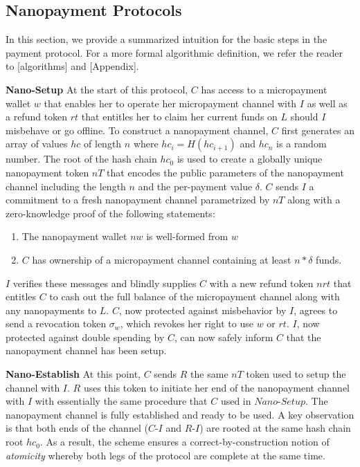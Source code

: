 \subsection{Nanopayment Protocols}

In this section, we provide a summarized intuition for the basic steps in the
payment protocol. For a more formal algorithmic definition, we refer the reader
to [algorithms] and [Appendix].

\textbf{Nano-Setup} At the start of this protocol, $C$ has access to a
micropayment wallet $w$ that enables her to operate her micropayment channel
with $I$ as well as a refund token $rt$ that entitles her to claim her current
funds on $L$ should $I$ misbehave or go offline. To construct a nanopayment
channel, $C$ first generates an array of values $hc$ of length $n$ where
$hc_i = H(hc_{i+1})$ and $hc_n$ is a random number. The root of the hash chain
$hc_0$ is used to create a globally unique nanopayment token $nT$ that encodes
the public parameters of the nanopayment channel including the length $n$ and
the per-payment value $\delta$. $C$ sends $I$ a commitment to a fresh
nanopayment channel parametrized by $nT$ along with a zero-knowledge proof of
the following statements:

\begin{enumerate}
\item The nanopayment wallet $nw$ is well-formed from $w$
\item $C$ has ownership of a micropayment channel containing at least $n *
  \delta$ funds.
\end{enumerate}

$I$ verifies these messages and blindly supplies $C$ with a new refund token $nrt$
that entitles $C$ to cash out the full balance of the micropayment channel along
with any nanopayments to $L$. $C$, now protected against misbehavior by $I$,
agrees to send a revocation token $\sigma_w$, which revokes her right to use $w$
or $rt$. $I$, now protected against double spending by $C$, can now safely
inform $C$ that the nanopayment channel has been setup.

\textbf{Nano-Establish} At this point, $C$ sends $R$ the same $nT$ token used to
setup the channel with $I$. $R$ uses this token to initiate her end of the
nanopayment channel with $I$ with essentially the same procedure that $C$ used
in $Nano$-$Setup$. The nanopayment channel is fully established and ready to be
used. A key observation is that both ends of the channel ($C$-$I$ and $R$-$I$)
are rooted at the same hash chain root $hc_0$. As a result, the scheme ensures a
correct-by-construction notion of \emph{atomicity} whereby both legs of the
protocol are complete at the same time.

